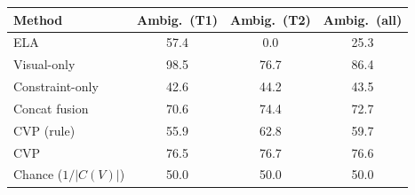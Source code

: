\begin{tabular}{lccc}
\toprule
Method & Ambig.\ (T1) & Ambig.\ (T2) & Ambig.\ (all)\\
\midrule
ELA & 57.4 & 0.0 & 25.3\\
Visual-only & 98.5 & 76.7 & 86.4\\
Constraint-only & 42.6 & 44.2 & 43.5\\
Concat fusion & 70.6 & 74.4 & 72.7\\
CVP (rule) & 55.9 & 62.8 & 59.7\\
CVP & 76.5 & 76.7 & 76.6\\
\midrule
Chance ($1/|C(V)|$) & 50.0 & 50.0 & 50.0\\
\bottomrule
\end{tabular}
